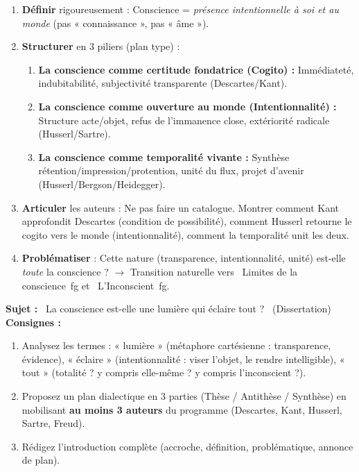\documentclass[11pt]{article}
\begin{document}
\begin{methode}
\begin{enumerate}
    \item \textbf{Définir} rigoureusement : Conscience = \emph{présence intentionnelle à soi et au monde} (pas « connaissance », pas « âme »).
    \item \textbf{Structurer} en 3 piliers (plan type) :
    \begin{enumerate}
        \item \textbf{La conscience comme certitude fondatrice (Cogito) :} Immédiateté, indubitabilité, subjectivité transparente (Descartes/Kant).
        \item \textbf{La conscience comme ouverture au monde (Intentionnalité) :} Structure acte/objet, refus de l'immanence close, extériorité radicale (Husserl/Sartre).
        \item \textbf{La conscience comme temporalité vivante :} Synthèse rétention/impression/protention, unité du flux, projet d'avenir (Husserl/Bergson/Heidegger).
    \end{enumerate}
    \item \textbf{Articuler} les auteurs : Ne pas faire un catalogue. Montrer comment Kant approfondit Descartes (condition de possibilité), comment Husserl retourne le cogito vers le monde (intentionnalité), comment la temporalité unit les deux.
    \item \textbf{Problématiser} : Cette nature (transparence, intentionnalité, unité) est-elle \emph{toute} la conscience ? $\rightarrow$ Transition naturelle vers \og~Limites de la conscience~fg{} et \og~L'Inconscient~fg{}.
\end{enumerate}
\end{methode}

\begin{exercice}
\textbf{Sujet :} \og~La conscience est-elle une lumière qui éclaire tout ?~\fg{} (Dissertation)
\textbf{Consignes :}
\begin{enumerate}
    \item Analysez les termes : « lumière » (métaphore cartésienne : transparence, évidence), « éclaire » (intentionnalité : viser l'objet, le rendre intelligible), « tout » (totalité ? y compris elle-même ? y compris l'inconscient ?).
    \item Proposez un plan dialectique en 3 parties (Thèse / Antithèse / Synthèse) en mobilisant \textbf{au moins 3 auteurs} du programme (Descartes, Kant, Husserl, Sartre, Freud).
    \item Rédigez l'introduction complète (accroche, définition, problématique, annonce de plan).
\end{enumerate}
\end{exercice}
\end{document}
